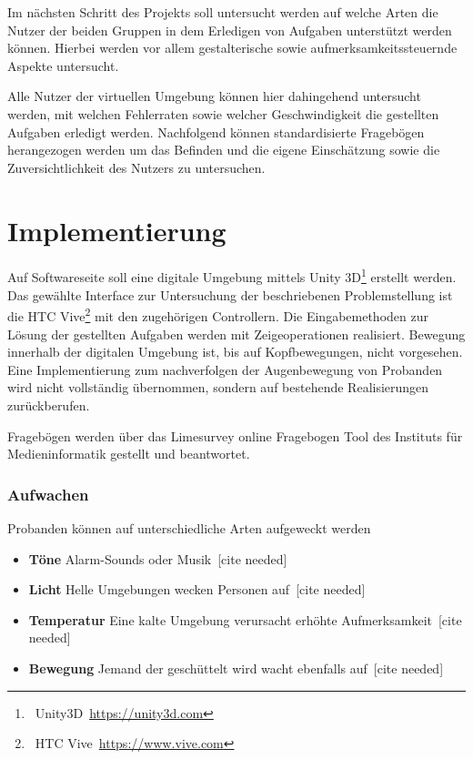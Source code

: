 \documentclass[a4paper, 11pt]{article}
\begin{document}

Im nächsten Schritt des Projekts soll untersucht werden auf welche Arten die Nutzer der beiden Gruppen in dem Erledigen von Aufgaben unterstützt werden können. Hierbei werden vor allem gestalterische sowie aufmerksamkeitssteuernde Aspekte untersucht. 

Alle Nutzer der virtuellen Umgebung können hier dahingehend untersucht werden, mit welchen Fehlerraten sowie welcher Geschwindigkeit die gestellten Aufgaben erledigt werden. Nachfolgend können standardisierte Fragebögen herangezogen werden um das Befinden und die eigene Einschätzung sowie die Zuversichtlichkeit des Nutzers zu untersuchen.

\section*{Implementierung}
Auf Softwareseite soll eine digitale Umgebung mittels Unity 3D\footnote{~Unity3D~\url{https://unity3d.com}} erstellt werden. Das gewählte Interface zur Untersuchung der beschriebenen Problemstellung ist die HTC Vive\footnote{~HTC Vive~\url{https://www.vive.com}} mit den zugehörigen Controllern. Die Eingabemethoden zur Lösung der gestellten Aufgaben werden mit Zeigeoperationen realisiert. Bewegung innerhalb der digitalen Umgebung ist, bis auf Kopfbewegungen, nicht vorgesehen. Eine Implementierung zum nachverfolgen der Augenbewegung von Probanden wird nicht vollständig übernommen, sondern auf bestehende Realisierungen zurückberufen.

Fragebögen werden über das Limesurvey online Fragebogen Tool des Instituts für Medieninformatik gestellt und beantwortet. 

\subsubsection*{Aufwachen}
Probanden können auf unterschiedliche Arten aufgeweckt werden
\begin{itemize}
    \item \textbf{Töne} Alarm-Sounds oder Musik~[cite needed]
    \item \textbf{Licht} Helle Umgebungen wecken Personen auf~[cite needed]
    \item \textbf{Temperatur} Eine kalte Umgebung verursacht erhöhte Aufmerksamkeit~[cite needed]
    \item \textbf{Bewegung} Jemand der geschüttelt wird wacht ebenfalls auf~[cite needed]
\end{itemize}
\end{document}
